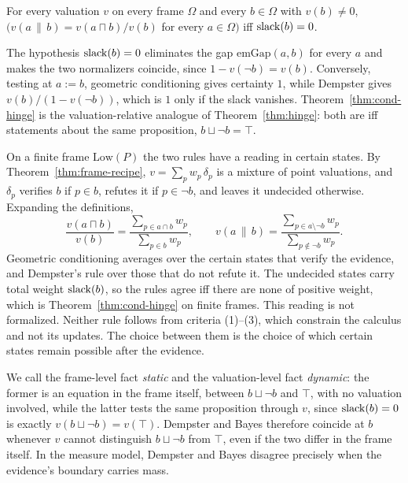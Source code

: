\begin{theorem}
\label{thm:cond-hinge}
For every valuation $v$ on every frame $\Omega$ and every
$b \in \Omega$ with $v(b) \neq 0$,
$\bigl(v(a \,\|\, b) = v(a \sqcap b)/v(b)$ for every
$a \in \Omega\bigr)$ iff $\mathrm{slack}(b) = 0$.
\end{theorem}

The hypothesis $\mathrm{slack}(b) = 0$ eliminates the gap
$\mathrm{emGap}(a,b)$ for every $a$ and makes the two normalizers
coincide, since $1 - v(\neg b) = v(b)$.
Conversely, testing at $a := b$, geometric conditioning gives
certainty $1$, while Dempster gives $v(b)/(1 - v(\neg b))$, which is
$1$ only if the slack vanishes.
Theorem~\ref{thm:cond-hinge} is the valuation-relative analogue of
Theorem~\ref{thm:hinge}: both are iff statements about the same
proposition, $b \sqcup \neg b = \top$.

On a finite frame $\mathrm{Low}(P)$ the two rules have a reading in
certain states. By Theorem~\ref{thm:frame-recipe},
$v = \sum_{p} w_p\,\delta_p$ is a mixture of point valuations, and
$\delta_p$ verifies $b$ if $p \in b$, refutes it if $p \in \neg b$, and
leaves it undecided otherwise. Expanding the definitions,
\[
  \frac{v(a \sqcap b)}{v(b)} = \frac{\sum_{p \in a \cap b} w_p}{\sum_{p \in b} w_p},
  \qquad
  v(a \,\|\, b) = \frac{\sum_{p \in a \setminus \neg b} w_p}{\sum_{p \notin \neg b} w_p}.
\]
Geometric conditioning averages over the certain states that verify the
evidence, and Dempster's rule over those that do not refute it. The
undecided states carry total weight $\mathrm{slack}(b)$, so the rules agree iff
there are none of positive weight, which is
Theorem~\ref{thm:cond-hinge} on finite frames. This reading is not
formalized. Neither rule follows from criteria (1)--(3), which constrain
the calculus and not its updates. The choice between them is the choice
of which certain states remain possible after the evidence.

We call the frame-level fact \emph{static} and the valuation-level
fact \emph{dynamic}: the former is an equation in the frame itself,
between $b \sqcup \neg b$ and $\top$, with no valuation involved,
while the latter tests the same proposition through $v$, since
$\mathrm{slack}(b) = 0$ is exactly $v(b \sqcup \neg b) = v(\top)$.  Dempster
and Bayes therefore coincide at $b$ whenever $v$ cannot distinguish
$b \sqcup \neg b$ from $\top$, even if the two differ in the frame
itself.  In the measure model, Dempster and Bayes disagree precisely
when the evidence's boundary carries mass.
